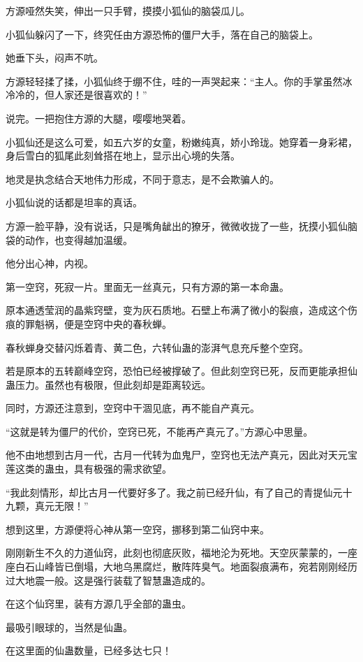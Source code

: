 \begin{this_body}
方源哑然失笑，伸出一只手臂，摸摸小狐仙的脑袋瓜儿。

小狐仙躲闪了一下，终究任由方源恐怖的僵尸大手，落在自己的脑袋上。

她垂下头，闷声不吭。

方源轻轻揉了揉，小狐仙终于绷不住，哇的一声哭起来：“主人。你的手掌虽然冰冷冷的，但人家还是很喜欢的！”

说完。一把抱住方源的大腿，嘤嘤地哭着。

小狐仙还是这么可爱，如五六岁的女童，粉嫩纯真，娇小玲珑。她穿着一身彩裙，身后雪白的狐尾此刻耸搭在地上，显示出心境的失落。

地灵是执念结合天地伟力形成，不同于意志，是不会欺骗人的。

小狐仙说的话都是坦率的真话。

方源一脸平静，没有说话，只是嘴角龇出的獠牙，微微收拢了一些，抚摸小狐仙脑袋的动作，也变得越加温缓。

他分出心神，内视。

第一空窍，死寂一片。里面无一丝真元，只有方源的第一本命蛊。

原本通透莹润的晶紫窍壁，变为灰石质地。石壁上布满了微小的裂痕，造成这个伤痕的罪魁祸，便是空窍中央的春秋蝉。

春秋蝉身交替闪烁着青、黄二色，六转仙蛊的澎湃气息充斥整个空窍。

若是原本的五转巅峰空窍，恐怕已经被撑破了。但此刻空窍已死，反而更能承担仙蛊压力。虽然也有极限，但此刻却是距离较远。

同时，方源还注意到，空窍中干涸见底，再不能自产真元。

“这就是转为僵尸的代价，空窍已死，不能再产真元了。”方源心中思量。

他不由地想到古月一代，古月一代转为血鬼尸，空窍也无法产真元，因此对天元宝莲这类的蛊虫，具有极强的需求欲望。

“我此刻情形，却比古月一代要好多了。我之前已经升仙，有了自己的青提仙元十九颗，真元无限！”

想到这里，方源便将心神从第一空窍，挪移到第二仙窍中来。

刚刚新生不久的力道仙窍，此刻也彻底灰败，福地沦为死地。天空灰蒙蒙的，一座座白石山峰皆已倒塌，大地乌黑腐烂，散阵阵臭气。地面裂痕满布，宛若刚刚经历过大地震一般。这是强行装载了智慧蛊造成的。

在这个仙窍里，装有方源几乎全部的蛊虫。

最吸引眼球的，当然是仙蛊。

在这里面的仙蛊数量，已经多达七只！


\end{this_body}
